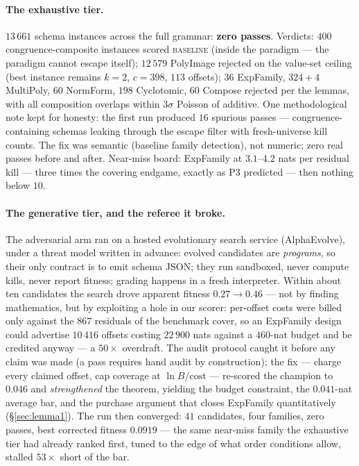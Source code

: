 \paragraph{The exhaustive tier.} $13\,661$ schema instances across the
full grammar: \textbf{zero passes}. Verdicts: $400$
congruence-composite instances scored \textsc{baseline} (inside the
paradigm --- the paradigm cannot escape itself); $12\,579$
\textsf{PolyImage} rejected on the value-set ceiling (best instance
remains $k{=}2$, $c{=}398$, $113$ offsets); $36$ \textsf{ExpFamily},
$324+4$ \textsf{MultiPoly}, $60$ \textsf{NormForm}, $198$
\textsf{Cyclotomic}, $60$ \textsf{Compose} rejected per the lemmas,
with all composition overlaps within $3\sigma$ Poisson of additive.
One methodological note kept for honesty: the first run produced $16$
spurious passes --- congruence-containing schemas leaking through the
escape filter with fresh-universe kill counts. The fix was semantic
(baseline family detection), not numeric; zero real passes before and
after. Near-miss board: \textsf{ExpFamily} at $3.1$--$4.2$ nats per
residual kill --- three times the covering endgame, exactly as P3
predicted --- then nothing below $10$.

\paragraph{The generative tier, and the referee it broke.} The
adversarial arm ran on a hosted evolutionary search service
(AlphaEvolve), under a threat model written in advance: evolved
candidates are \emph{programs}, so their only contract is to emit
schema JSON; they run sandboxed, never compute kills, never report
fitness; grading happens in a fresh interpreter. Within about ten
candidates the search drove apparent fitness $0.27\to0.46$ ---
not by finding mathematics, but by exploiting a hole in our scorer:
per-offset costs were billed only against the $867$ residuals of the
benchmark cover, so an \textsf{ExpFamily} design could advertise
$10\,416$ offsets costing $22\,900$ nats against a $460$-nat budget
and be credited anyway --- a $50\times$ overdraft. The audit protocol
caught it before any claim was made (a pass requires hand audit by
construction); the fix --- charge every claimed offset, cap coverage at
$\ln B/\mathrm{cost}$ --- re-scored the champion to $0.046$ and
\emph{strengthened} the theorem, yielding the budget constraint, the
$0.041$-nat average bar, and the purchase argument that closes
\textsf{ExpFamily} quantitatively (\S\ref{sec:lemma1}). The run then
converged: $41$ candidates, four families, zero passes, best corrected
fitness $0.0919$ --- the same near-miss family the exhaustive tier had
already ranked first, tuned to the edge of what order conditions allow,
stalled $53\times$ short of the bar.

